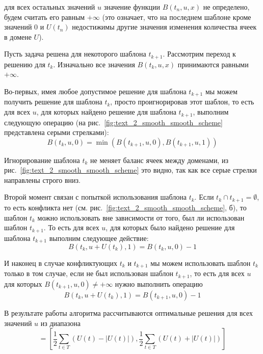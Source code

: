 \documentclass[a4paper,14pt]{extarticle}                     %
\theoremstyle{plain}                                         %
\begin{document}
для всех остальных значений $u$ значение функции $B(t_n, u, x)$ не определено, будем считать его равным $+\infty$ (это означает, что на последнем шаблоне кроме значений $0$ и $U(t_n)$ недостижимы другие значения изменения количества ячеек в домене $U$).

Пусть задача решена для некоторого шаблона $t_{k + 1}$.
Рассмотрим переход к решению для $t_k$.
Изначально все значения $B(t_k, u, x)$ принимаются равными $+\infty$.

Во-первых, имея любое допустимое решение для шаблона $t_{k + 1}$ мы можем получить решение для шаблона $t_k$, просто проигнорировав этот шаблон, то есть для всех $u$, для которых найдено решение для шаблона $t_{k + 1}$, выполним следующую операцию (на рис.~\ref{fig:text_2_smooth_smooth_scheme} представлена серыми стрелками):
\begin{equation}
	B(t_k, u, 0) = \min \left( B(t_{k + 1}, u, 0), B(t_{k + 1}, u, 1) \right)
\end{equation}

Игнорирование шаблона $t_k$ не меняет баланс ячеек между доменами, из рис.~\ref{fig:text_2_smooth_smooth_scheme} это видно, так как все серые стрелки направлены строго вниз.

Второй момент связан с попыткой использования шаблона $t_k$.
Если $t_k \cap t_{k + 1} = \emptyset$, то есть конфликта нет (см. рис.~\ref{fig:text_2_smooth_smooth_scheme}, б), то шаблон $t_k$ можно использовать вне зависимости от того, был ли использован шаблон $t_{k + 1}$.
То есть для всех $u$, для которых было найдено решение для шаблона $t_{k + 1}$ выполним следующее действие:
\begin{equation}
	B(t_k, u + U(t_k), 1) = B(t_k, u, 0) - 1
\end{equation}

И наконец в случае конфликтующих $t_k$ и $t_{k + 1}$ мы можем использовать шаблон $t_k$ только в том случае, если не был использован шаблон $t_{k + 1}$, то есть для всех $u$ для которых $B(t_{k + 1}, u, 0) \ne +\infty$ нужно выполнить операцию
\begin{equation}
	B(t_k, u + U(t_k), 1) = B(t_{k + 1}, u, 0) - 1
\end{equation}

В результате работы алгоритма рассчитываются оптимальные решения для всех значений $u$ из диапазона
\begin{equation}
	[U_{min}, U_{max}] = \left[ \frac{1}{2} \sum_{t \in T}{(U(t) - |U(t)|)}, \frac{1}{2} \sum_{t \in T}{(U(t) + |U(t)|)} \right]
\end{equation}
\end{document}

